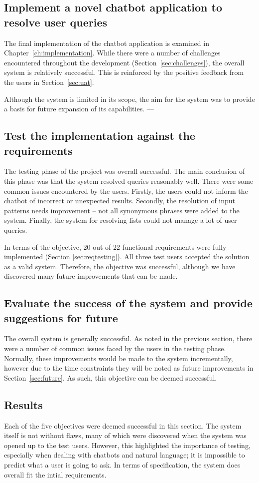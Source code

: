 \subsection{Implement a novel chatbot application to resolve user queries}
The final implementation of the chatbot application is examined in Chapter~\ref{ch:implementation}. While there were a number of challenges encountered throughout the development (Section~\ref{sec:challenges}), the overall system is relatively successful. This is reinforced by the positive feedback from the users in Section~\ref{sec:uat}.

Although the system is limited in its scope, the aim for the system was to provide a basis for future expansion of its capabilities. ---

\subsection{Test the implementation against the requirements}
The testing phase of the project was overall successful. The main conclusion of this phase was that the system resolved queries reasonably well. There were some common issues encountered by the users. Firstly, the users could not inform the chatbot of incorrect or unexpected results. Secondly, the resolution of input patterns needs improvement -- not all synonymous phrases were added to the system. Finally, the system for resolving lists could not manage a lot of user queries.

In terms of the objective, 20 out of 22 functional requirements were fully implemented (Section \ref{sec:reqtesting}). All three test users accepted the solution as a valid system. Therefore, the objective was successful, although we have discovered many future improvements that can be made.

\subsection{Evaluate the success of the system and provide suggestions for future}
The overall system is generally successful. As noted in the previous section, there were a number of common issues faced by the users in the testing phase. Normally, these improvements would be made to the system incrementally, however due to the time constraints they will be noted as future improvements in Section~\ref{sec:future}. As such, this objective can be deemed successful.

\subsection{Results}
Each of the five objectives were deemed successful in this section. The system itself is not without flaws, many of which were discovered when the system was opened up to the test users. However, this highlighted the importance of testing, especially when dealing with chatbots and natural language; it is impossible to predict what a user is going to ask. In terms of specification, the system does overall fit the intial requirements.

